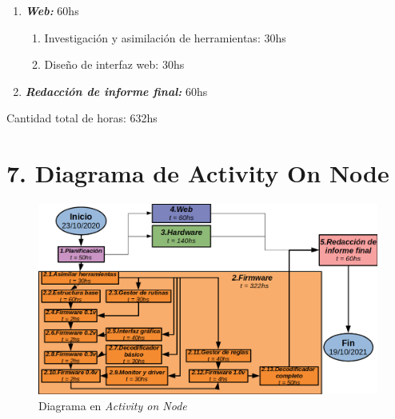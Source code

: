 \documentclass[11pt]{charter}
\begin{document}
\begin{enumerate}
	 \item \textbf{\textit{Web:}} 60hs
	 \begin{enumerate}
	 	\item Investigación y asimilación de herramientas: 30hs
	 	\item Diseño de interfaz web: 30hs
	 \end{enumerate}
	 
	 \item \textbf{\textit{Redacción de informe final:}} 60hs
\end{enumerate}

Cantidad total de horas: 632hs

\clearpage

\section{7. Diagrama de Activity On Node}
\label{sec:AoN}



\begin{figure}[htpb]
\centering 
\includegraphics[width=1.1\textwidth]{./Figuras/activityOnNode2.png}
\caption{Diagrama en \textit{Activity on Node}}
\label{fig:AoN}
\end{figure}


\end{document}
